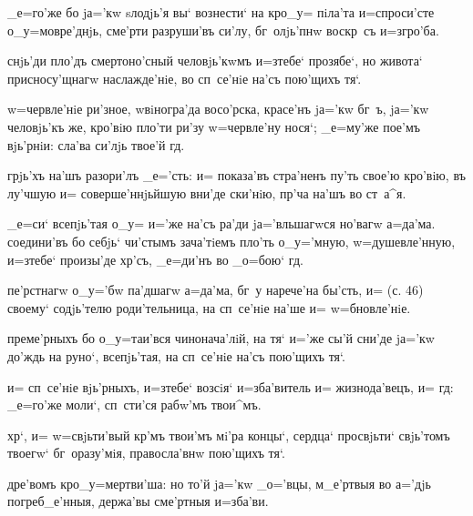 _е=го'же бо jа='кw sлодjь'я вы` вознести` на кр о_у= 
пiла'та и=спроси'сте о_у=мовре'днjь, сме'рти разруши'въ 
си'лу, бг~олjь'пнw воскр~съ и=з\ъ гро'ба.

снjь'ди пло'дъ смертоно'сный человjь'кwмъ и=з\ъ тебе` 
прозябе`, но живота` присносу'щнагw наслажде'нiе, во 
сп~се'нiе на'съ пою'щихъ тя`.


w=червле'нiе ри'зное, w\т вiногра'да восо'рска, красе'нъ 
jа='кw бг~ъ, jа='кw человjь'къ же, кро'вiю пло'ти ри'зу 
w=червле'ну нося`; _е=му'же пое'мъ вjь'рнiи: сла'ва 
си'лjь твое'й гд.

грjь'хъ на'шъ разори'лъ _е='сть: и= показа'въ стра'ненъ 
пу'ть свое'ю кро'вiю, въ лу'чшую и= соверше'ннjьйшую 
вни'де ски'нiю, пр'ча на'шъ во ст~а^я.

_е=си` всепjь'тая о_у= и='же на'съ ра'ди jа='вльшагwся 
но'вагw а=да'ма. соедини'въ бо себjь` чи'стымъ зача'тiемъ 
пло'ть о_у='мную, w=душевле'нную, и=з\ъ тебе` произы'де 
хр'съ, _е=ди'нъ во _о=бою` гд.


пе'рстнагw о_у='бw па'дшагw а=да'ма, бг~у нарече'на 
бы'сть, и= (с. 46) своему` содjь'телю роди'тельница, на 
сп~се'нiе на'ше и= w=бновле'нiе.

преме'рныхъ бо о_у=таи'вся чинонача'лiй, на тя` и='же 
сы'й сни'де jа='кw до'ждь на руно`, всепjь'тая, на 
сп~се'нiе на'съ пою'щихъ тя`.

и= сп~се'нiе вjь'рныхъ, и=з\ъ тебе` возсiя` и=зба'витель 
и= жизнода'вецъ, и= гд: _е=го'же моли`, сп~сти'ся 
рабw'мъ твои^мъ.


хр`, и= w=свjьти'вый кр'мъ твои'мъ мi'ра концы`, 
сердца` просвjьти` свjь'томъ твоегw` бг~оразу'мiя, 
правосла'внw пою'щихъ тя`.

дре'вомъ кр о_у=мертви'ша: но то'й jа='кw _о='вцы, 
м_е'ртвыя во а='дjь погреб_е'нныя, держа'вы сме'ртныя 
и=зба'ви.

